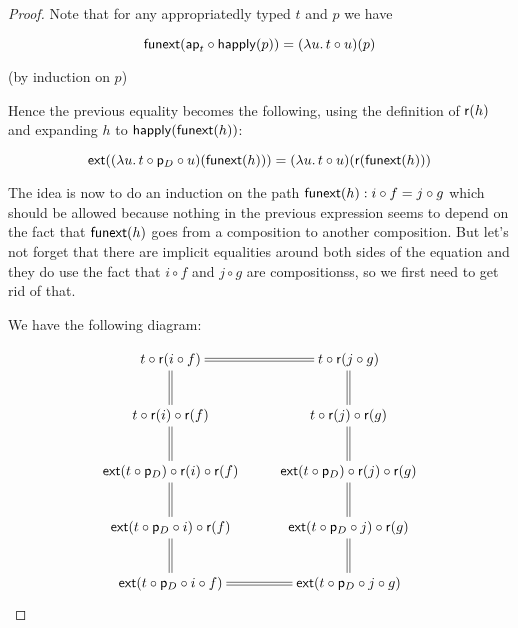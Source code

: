 \begin{proof}
  Note that for any appropriatedly typed $t$ and $p$ we have

  \[\mathsf{funext}(\mathsf{ap}_{t}\circ\mathsf{happly}(p))={(\lambda{}u.\,t\circ{}u)}\!\left({p}\right)\]

  (by induction on $p$)

  Hence the previous equality becomes the following, using the definition of
  $\mathsf{r}(h)$ and expanding $h$ to $\mathsf{happly}(\mathsf{funext}(h))$:

  \[{\mathsf{ext}}\!\left({{(\lambda{}u.\,t\circ\mathsf{p}_D\circ{}u)}\!\left({\mathsf{funext}(h)}\right)}\right)=
  {(\lambda{}u.\,t\circ{}u)}\!\left({{\mathsf{r}}\!\left({\mathsf{funext}(h)}\right)}\right)\]

  The idea is now to do an induction on the path $\mathsf{funext}(h):i\circ f = j\circ
  g$ which should be allowed because nothing in the previous expression seems to
  depend on the fact that $\mathsf{funext}(h)$ goes from a composition to another
  composition. But let’s not forget that there are implicit equalities around
  both sides of the equation and they do use the fact that $i\circ f$ and
  $j\circ g$ are compositionss, so we first need to get rid of that.






  \bigskip

  We have the following diagram:

  \[\xymatrix{
    t\circ\reflect(i\circ f) \ar@{=}[r] \ar@{=}[d] &
      t\circ\reflect(j\circ g) \ar@{=}[d] \\
    t\circ\reflect(i)\circ\reflect(f) \ar@{=}[d] &
      t\circ\reflect(j)\circ\reflect(g) \ar@{=}[d] \\
    \extend{t\circ\project_D}\circ\reflect(i)\circ\reflect(f) \ar@{=}[d] &
      \extend{t\circ\project_D}\circ\reflect(j)\circ\reflect(g) \ar@{=}[d] \\
    \extend{t\circ\project_D\circ i}\circ\reflect(f) \ar@{=}[d] &
      \extend{t\circ\project_D\circ j}\circ\reflect(g) \ar@{=}[d] \\
    \extend{t\circ\project_D\circ i\circ f} \ar@{=}[r] &
      \extend{t\circ\project_D\circ j\circ g}\\
  }\]


\end{proof}
